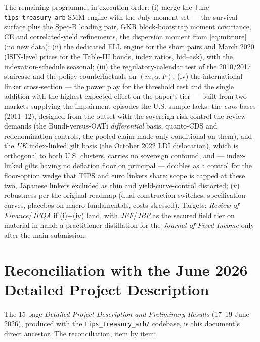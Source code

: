 \documentclass[11pt]{article}
\begin{document}
The remaining programme, in execution order: (i) merge the June \texttt{tips\_treasury\_arb} SMM engine with the July moment set --- the survival surface plus the Spec-B loading pair, GKR block-bootstrap moment covariance, CE and correlated-yield refinements, the dispersion moment from \eqref{eq:mixture} (no new data); (ii) the dedicated FLL engine for the short pairs and March 2020 (ISIN-level prices for the Table-III bonds, index ratios, bid--ask), with the indexation-schedule seasonal; (iii) the regulatory-calendar test of the 2010/2017 staircase and the policy counterfactuals on $(m,\alpha,F)$; (iv) the international linker cross-section --- the power play for the threshold test and the single addition with the highest expected effect on the paper's tier --- built from two markets supplying the impairment episodes the U.S. sample lacks: the \emph{euro} bases (2011--12), designed from the outset with the sovereign-risk control the review demands (the Bund\texteuro i-versus-OAT\texteuro i \emph{differential} basis, quanto-CDS and redenomination controls, the pooled claim made only conditional on them), and the \emph{UK} index-linked gilt basis (the October 2022 LDI dislocation), which is orthogonal to both U.S. clusters, carries no sovereign confound, and --- index-linked gilts having no deflation floor on principal --- doubles as a control for the floor-option wedge that TIPS and euro linkers share; scope is capped at these two, Japanese linkers excluded as thin and yield-curve-control distorted; (v) robustness per the original roadmap (dual construction switches, specification curves, placebos on macro fundamentals, costs stressed). Targets: \emph{Review of Finance}/\emph{JFQA} if (i)+(iv) land, with \emph{JEF}/\emph{JBF} as the secured field tier on material in hand; a practitioner distillation for the \emph{Journal of Fixed Income} only after the main submission.

\appendix

\section{Reconciliation with the June 2026 Detailed Project Description}

The 15-page \emph{Detailed Project Description and Preliminary Results} (17--19 June 2026), produced with the \texttt{tips\_treasury\_arb/} codebase, is this document's direct ancestor. The reconciliation, item by item:
\end{document}
